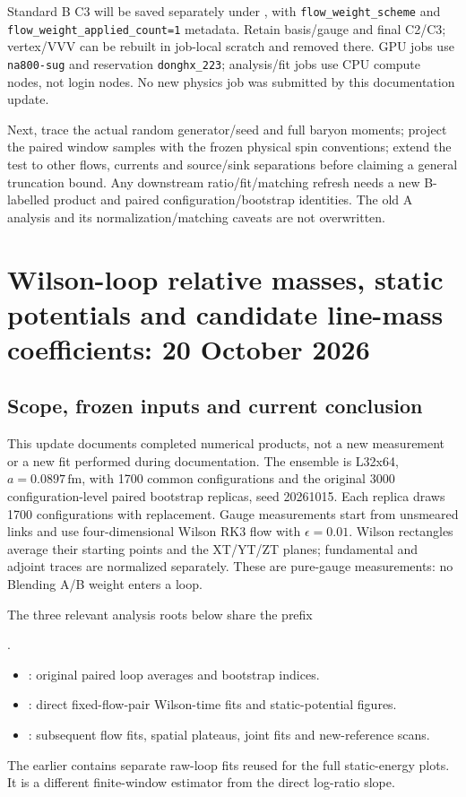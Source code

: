 \documentclass[11pt]{article}
\numberwithin{equation}{section}
\begin{document}
Standard B C3 will be saved separately under
, with
\texttt{flow\_weight\_scheme} and
\texttt{flow\_weight\_applied\_count=1} metadata.
Retain basis/gauge and final C2/C3; vertex/VVV can be rebuilt in job-local
scratch and removed there. GPU jobs use \texttt{na800-sug} and reservation
\texttt{donghx\_223}; analysis/fit jobs use CPU compute nodes, not login
nodes. No new physics job was submitted by this documentation update.

Next, trace the actual random generator/seed and full baryon moments;
project the paired window samples with the frozen physical spin
conventions; extend the test to other flows, currents and source/sink
separations before claiming a general truncation bound. Any downstream
ratio/fit/matching refresh needs a new B-labelled product and paired
configuration/bootstrap identities. The old A analysis and its
normalization/matching caveats are not overwritten.

\section{Wilson-loop relative masses, static potentials and candidate
line-mass coefficients: 20 October 2026}
\label{sec:line-mass-oct20}

\subsection{Scope, frozen inputs and current conclusion}

This update documents completed numerical products, not a new measurement
or a new fit performed during documentation. The ensemble is L32x64,
\(a=0.0897\,\mathrm{fm}\), with 1700 common configurations and the original
3000 configuration-level paired bootstrap replicas, seed 20261015. Each
replica draws 1700 configurations with replacement. Gauge measurements
start from unsmeared links and use four-dimensional Wilson RK3 flow with
\(\epsilon=0.01\). Wilson rectangles average their starting points and the
XT/YT/ZT planes; fundamental and adjoint traces are normalized separately.
These are pure-gauge measurements: no Blending A/B weight enters a loop.

The three relevant analysis roots below share the prefix
\begin{center}
.
\end{center}
\begin{itemize}
 \item {}: original paired loop averages
       and bootstrap indices.
 \item {}: direct fixed-flow-pair
       Wilson-time fits and static-potential figures.
 \item {}: subsequent flow fits,
       spatial plateaus, joint fits and new-reference scans.
\end{itemize}
The earlier  contains separate
raw-loop fits reused for the full static-energy plots. It is a different
finite-window estimator from the direct log-ratio slope.
\end{document}
